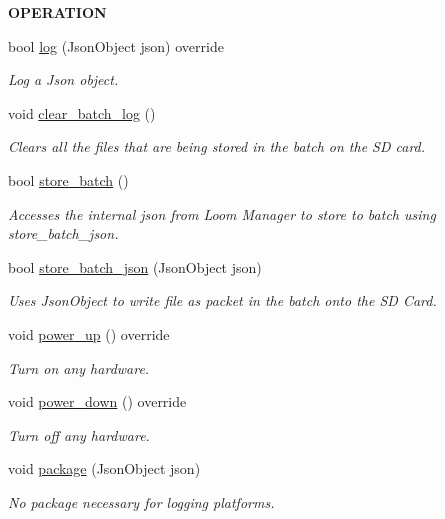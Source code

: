 \begin{Indent}{\bf O\+P\+E\+R\+A\+T\+I\+ON}\par
\begin{DoxyCompactItemize}
\item 
bool \hyperlink{class_loom___batch_s_d_a3d80d1e31762c8b6328a05485cc8af88}{log} (Json\+Object json) override
\begin{DoxyCompactList}\small\item\em Log a Json object. \end{DoxyCompactList}\item 
void \hyperlink{class_loom___batch_s_d_ae2e8856853e8a0ac0a3f92b03900eb40}{clear\+\_\+batch\+\_\+log} ()
\begin{DoxyCompactList}\small\item\em Clears all the files that are being stored in the batch on the SD card. \end{DoxyCompactList}\item 
bool \hyperlink{class_loom___batch_s_d_af87c1920bf19e06b7585e8bc1bf72059}{store\+\_\+batch} ()
\begin{DoxyCompactList}\small\item\em Accesses the internal json from Loom Manager to store to batch using store\+\_\+batch\+\_\+json. \end{DoxyCompactList}\item 
bool \hyperlink{class_loom___batch_s_d_ade1673f26d7b667571f76a4c7922571b}{store\+\_\+batch\+\_\+json} (Json\+Object json)
\begin{DoxyCompactList}\small\item\em Uses Json\+Object to write file as packet in the batch onto the SD Card. \end{DoxyCompactList}\item 
void \hyperlink{class_loom___batch_s_d_aa847506aab0cba43e0d98e0bb663a915}{power\+\_\+up} () override
\begin{DoxyCompactList}\small\item\em Turn on any hardware. \end{DoxyCompactList}\item 
void \hyperlink{class_loom___batch_s_d_adc78401b4bea4b41c76717e57417c1d5}{power\+\_\+down} () override
\begin{DoxyCompactList}\small\item\em Turn off any hardware. \end{DoxyCompactList}\item 
void \hyperlink{class_loom___batch_s_d_a738bf5b08c3eba7ec2711b656e6f90bd}{package} (Json\+Object json)
\begin{DoxyCompactList}\small\item\em No package necessary for logging platforms. \end{DoxyCompactList}\end{DoxyCompactItemize}
\end{Indent}
